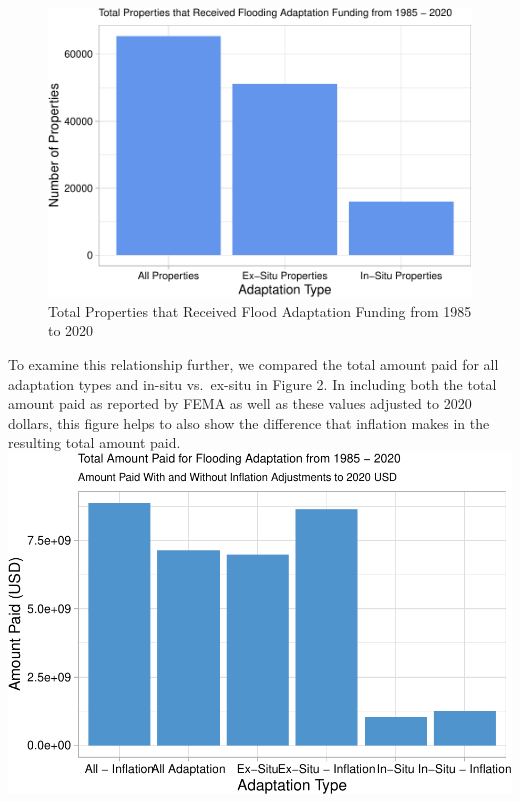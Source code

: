 \documentclass[
  12pt,
]{article}
\begin{document}
\begin{figure}
\centering
\includegraphics{finalreport_files/figure-latex/unnamed-chunk-5-1.pdf}
\caption{Total Properties that Received Flood Adaptation Funding from
1985 to 2020}
\end{figure}

To examine this relationship further, we compared the total amount paid
for all adaptation types and in-situ vs.~ex-situ in Figure 2. In
including both the total amount paid as reported by FEMA as well as
these values adjusted to 2020 dollars, this figure helps to also show
the difference that inflation makes in the resulting total amount paid.
\newline
\includegraphics{finalreport_files/figure-latex/unnamed-chunk-6-1.pdf}
\end{document}
